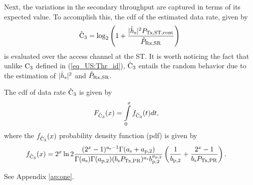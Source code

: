 Next, the variations in the secondary throughput are captured in terms of its expected value. To accomplish this, the cdf of the estimated data rate, given by%
\begin{align}
\hat{\text{{C}}}_{\text{3}}  = \log_2 \left(1 + \frac{|\hat{h}_{\text{s}}|^2 P_{\text{Tx,ST,cont}}}{\hat{P}_{\text{Rx,SR}}} \right) \label{eq_US:eca}
\end{align}
is evaluated over the access channel at the ST. It is worth noticing the fact that unlike $\text{C}_{\text{3}}$ defined in (\ref{eq_US:Thr_id}), $\hat{\text{{C}}}_{\text{3}}$ entails the random behavior due to the estimation of $|\hat{h}_{\text{s}}|^2$ and $\hat{P}_{\text{Rx,SR}}$.
\begin{lemma} \label{lm_US:lm5}
\normalfont 
The cdf of data rate $\hat{\text{{C}}}_{\text{3}}$ is given by
\begin{align}
F_{\hat{\text{{C}}}_{\text{3}}}(x) &= \int\limits_{0}^{x} f_{\hat{\text{{C}}}_{\text{3}}}(t) dt, \label{eq_US:dis_C} 
\end{align}
where the $f_{\hat{\text{{C}}}_{\text{3}}}(x)$ probability density function (pdf) is given by 
\begin{align}
f_{\hat{\text{{C}}}_{\text{3}}}(x) &= 2^x \ln 2 \frac{(2^x - 1)^{a_{\text{s}} - 1} \Gamma(a_{\text{s}} + a_{\text{p,2}})}{\Gamma(a_{\text{s}}) \Gamma(a_{\text{p,2}}) (b_{\text{s}} P_{\text{Tx,PR}}) ^{a_{\text{s}}} b_{\text{p,2}}^{a_{\text{p,2}}}} \left(\frac{1}{b_{\text{p,2}}} + \frac{2^x - 1}{b_{\text{s}} P_{\text{Tx,PR}}}\right). \label{eq_US:den_C}
\end{align}
\end{lemma}
\begin{IEEEproof}
See Appendix \ref{ap:one}.
\end{IEEEproof}

